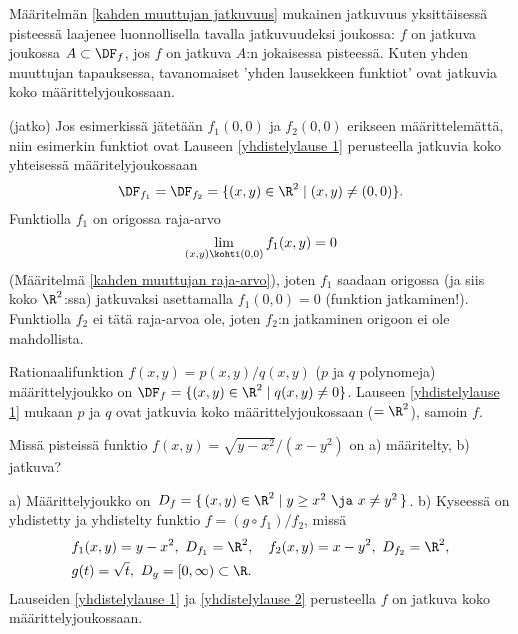 Määritelmän \ref{kahden muuttujan jatkuvuus} mukainen jatkuvuus yksittäisessä pisteessä
laajenee luonnollisella tavalla jatkuvuudeksi joukossa: $f$ on jatkuva joukossa
$A\subset\DF_f$, jos $f$ on jatkuva $A$:n jokaisessa pisteessä. Kuten yhden muuttujan
tapauksessa, tavanomaiset 'yhden lausekkeen funktiot' ovat jatkuvia koko määrittelyjoukossaan.
\jatko \begin{Exa} (jatko) Jos esimerkissä jätetään $f_1(0,0)$ ja $f_2(0,0)$ erikseen
määrittelemättä, niin esimerkin funktiot ovat Lauseen \ref{yhdistelylause 1} perusteella
jatkuvia koko yhteisessä määritelyjoukossaan
\[
\DF_{f_1} = \DF_{f_2} = \{(x,y)\in\R^2 \mid (x,y)\neq(0,0)\}.
\]
Funktiolla $f_1$ on origossa raja-arvo
\[
\lim_{(x,y)\kohti(0,0)}f_1(x,y)=0
\]
(Määritelmä \ref{kahden muuttujan raja-arvo}), joten $f_1$ saadaan origossa (ja siis koko
$\R^2$:ssa) jatkuvaksi asettamalla $f_1(0,0)=0$ (funktion jatkaminen!). Funktiolla $f_2$ ei
tätä raja-arvoa ole, joten $f_2$:n jatkaminen origoon ei ole mahdollista. \loppu
\end{Exa}
\begin{Exa} Rationaalifunktion $f(x,y)=p(x,y)/q(x,y)$ ($p$ ja $q$ polynomeja) määrittelyjoukko
on $\DF_f=\{(x,y)\in\R^2 \mid q(x,y) \ne 0\}$. Lauseen \ref{yhdistelylause 1} mukaan $p$ ja $q$
ovat jatkuvia koko määrittelyjoukossaan ($=\R^2$), samoin $f$. \loppu
\end{Exa}
\begin{Exa} Missä pisteissä funktio $f(x,y) = \sqrt{y-x^2}/(x-y^2)$ on a) määritelty,
b) jatkuva? 
\end{Exa}
\ratk a) Määrittelyjoukko on
$\,D_f = \{\,(x,y) \in \R^2 \mid y \ge x^2\ \ja\ x \neq y^2\,\}$. \newline 
b) Kyseessä on yhdistetty ja yhdistelty funktio $f = (g \circ f_1)/f_2$, missä 
\[ \begin{aligned} &f_1(x,y)=y-x^2,\ D_{f_1} = \R^2, \quad f_2(x,y)=x-y^2,\ D_{f_2} = \R^2, \\
                   &g(t) = \sqrt{t},\ D_g = [0,\infty) \subset \R. 
   \end{aligned} \]
Lauseiden \ref{yhdistelylause 1} ja \ref{yhdistelylause 2} perusteella $f$ on jatkuva koko 
määrittelyjoukossaan. \loppu 

